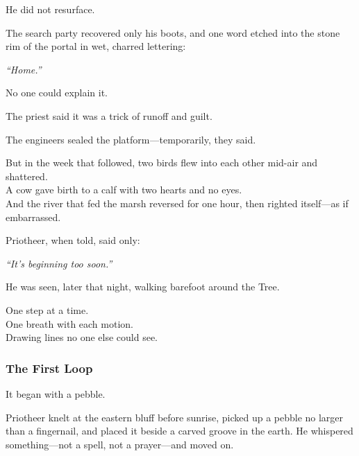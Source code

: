 \documentclass[12pt]{article}
\begin{document}
\vspace{0.5em}
He did not resurface.

\vspace{0.5em}
The search party recovered only his boots, and one word etched into the stone rim of the portal in wet, charred lettering:

\vspace{0.5em}
\textit{``Home.''}

\vspace{0.5em}
No one could explain it.

\vspace{0.5em}
The priest said it was a trick of runoff and guilt.

\vspace{0.5em}
The engineers sealed the platform---temporarily, they said.

\vspace{0.5em}
But in the week that followed, two birds flew into each other mid-air and shattered.\\
A cow gave birth to a calf with two hearts and no eyes.\\
And the river that fed the marsh reversed for one hour, then righted itself---as if embarrassed.

\vspace{0.5em}
Priotheer, when told, said only:

\vspace{0.5em}
\textit{``It’s beginning too soon.''}

\vspace{0.5em}
He was seen, later that night, walking barefoot around the Tree.

\vspace{0.5em}
One step at a time.\\
One breath with each motion.\\
Drawing lines no one else could see.

\dotfill

\subsubsection{The First Loop}

It began with a pebble.

\vspace{0.5em}
Priotheer knelt at the eastern bluff before sunrise, picked up a pebble no larger than a fingernail, and placed it beside a carved groove in the earth. He whispered something---not a spell, not a prayer---and moved on.
\end{document}
